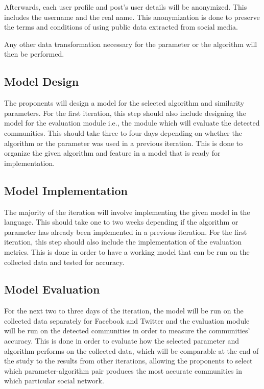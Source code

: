 Afterwards, each user profile and post’s user details will be anonymized. This includes the username and the real name.  This anonymization is done to preserve the terms and conditions of using public data extracted from social media. 

Any other data transformation necessary for the parameter or the algorithm will then be performed.

\subsection{Model Design}

The proponents will design a model for the selected algorithm and similarity parameters. For the first iteration, this step should also include designing the model for the evaluation module i.e., the module which will evaluate the detected communities. This should take three to four days depending on whether the algorithm or the parameter was used in a previous iteration. This is done to organize the given algorithm and feature in a model that is ready for implementation.

\subsection{Model Implementation}

The majority of the iteration will involve implementing the given model in the language. This should take one to two weeks depending if the algorithm or parameter has already been implemented in a previous iteration. For the first iteration, this step should also include the implementation of the evaluation metrics. This is done in order to have a working model that can be run on the collected data and tested for accuracy.

\subsection{Model Evaluation}

For the next two to three days of the iteration, the model will be run on the collected data separately for Facebook and Twitter and the evaluation module will be run on the detected communities in order to measure the communities’ accuracy. This is done in order to evaluate how the selected parameter and algorithm performs on the collected data, which will be comparable at the end of the study to the results from other iterations, allowing the proponents to select which parameter-algorithm pair produces the most accurate communities in which particular social network.

